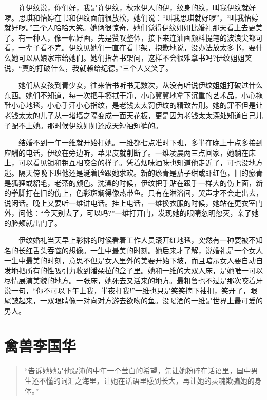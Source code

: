 \documentclass[12pt,UTF8]{ctexbook}
\begin{document}
　　许伊纹说，你们好，我是许伊纹，秋水伊人的伊，纹身的纹，叫我伊纹就好啰。思琪和怡婷在书和伊纹面前很放松，她们说：\enquote{叫我思琪就好啰}，\enquote{叫我怡婷就好啰。}三个人哈哈大笑。她俩很惊奇，她们觉得伊纹姐姐比婚礼那天看上去更美了。有一种人，像一幅好画，先是赞叹整体，接下来连油画颜料提笔的波浪尖都可看，一辈子看不完。伊纹见她们一直在看书架，抱歉地说，没办法放太多书，要什么她可以从娘家带给她们。她们指著书架问，这样不会很难拿书吗?伊纹姐姐笑说，\enquote{真的打破什么，我就赖给纪德。}三个人又笑了。

　　她们从女孩到青少女，往来借书听书无数次，从没有听说伊纹姐姐打破过什么东西。她们不知道，每一次把手擦拭干净，小心翼翼地拿下沉重的艺术品，小心拖鞋小心地毯，小心手汗小心指纹，是老钱太太罚伊纹的精致苦刑。她的罪不但是让老钱太太的儿子从一堵墙之隔变成一面天花板，更是因为老钱太太深处知道自己儿子配不上她。那时候伊纹姐姐还成天短袖短裤的。

　　结婚不到一年一维就开始打她。一维都七点准时下班，多半在晚上十点多接到应酬的电话，伊纹在旁边听，苹果皮就削断了。一维凌晨两三点回家，她躺在床上，可以看见锁和钥互相咬合的样子。凭着烟味酒味也知道他走近了，可也没地方逃。隔天傍晚下班他还是涎着脸跟她求欢。新的瘀青是茄子绀或虾红色，旧的瘀青是狐狸或貂毛，老茶的颜色。洗澡的时候，伊纹把手贴在跟手一样大的伤上面，新的拳脚打在旧的伤上，色彩斑斓得像热带鱼。只有在淋浴间，哭声才不会走出去，说闲话。晚上又要听一维讲电话。挂上电话，一维换衣服的时候，她站在更衣室门外，问他：\enquote{今天别去了，可以吗?}一维打开门，发现她的眼睛忽明忽灭，亲了她的脸颊就出门了。

　　伊纹婚礼当天早上彩排的时候看着工作人员滚开红地毯，突然有一种要被不知名的长红舌头吞噬的想像。一生中最美的时刻。她后来才了解，说婚礼是一个女人一生中最美的时刻，意思不但是女人里外的美要开始下坡，而且暗示女人要自动自发地把所有的性吸引力收到潘朵拉的盒子里。她和一维的大双人床，是她唯一可以尽情展演美貌的地方。一张床，她死去又活来的地方。最粗鲁也不过是那次咬着牙说一句，\enquote{你不可以下午上我，半夜打我!}一维也只是笑笑摘下袖扣，笑开了，眼尾皱起来，一双眼睛像一对向对方游去欲吻的鱼。没喝酒的一维是世界上最可爱的男人。

\hypertarget{ux79bdux517dux674eux56fdux534e}{%
\section*{禽兽李国华}\label{ux79bdux517dux674eux56fdux534e}}

\begin{quote}
\enquote{告诉她她是他混沌的中年一个莹白的希望，先让她粉碎在话语里，国中男生还不懂的词汇之海里，让她在话语里感到长大，再让她的灵魂欺骗她的身体。}
\end{quote}
\end{document}
